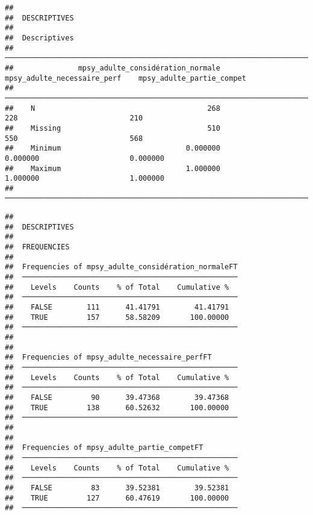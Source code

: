 \documentclass[
]{article}
\begin{document}
\begin{verbatim}
## 
##  DESCRIPTIVES
## 
##  Descriptives                                                                                                 
##  ──────────────────────────────────────────────────────────────────────────────────────────────────────────── 
##               mpsy_adulte_considération_normale    mpsy_adulte_necessaire_perf    mpsy_adulte_partie_compet   
##  ──────────────────────────────────────────────────────────────────────────────────────────────────────────── 
##    N                                        268                            228                          210   
##    Missing                                  510                            550                          568   
##    Minimum                             0.000000                       0.000000                     0.000000   
##    Maximum                             1.000000                       1.000000                     1.000000   
##  ────────────────────────────────────────────────────────────────────────────────────────────────────────────
\end{verbatim}

\begin{verbatim}
## 
##  DESCRIPTIVES
## 
##  FREQUENCIES
## 
##  Frequencies of mpsy_adulte_considération_normaleFT 
##  ────────────────────────────────────────────────── 
##    Levels    Counts    % of Total    Cumulative %   
##  ────────────────────────────────────────────────── 
##    FALSE        111      41.41791        41.41791   
##    TRUE         157      58.58209       100.00000   
##  ────────────────────────────────────────────────── 
## 
## 
##  Frequencies of mpsy_adulte_necessaire_perfFT       
##  ────────────────────────────────────────────────── 
##    Levels    Counts    % of Total    Cumulative %   
##  ────────────────────────────────────────────────── 
##    FALSE         90      39.47368        39.47368   
##    TRUE         138      60.52632       100.00000   
##  ────────────────────────────────────────────────── 
## 
## 
##  Frequencies of mpsy_adulte_partie_competFT         
##  ────────────────────────────────────────────────── 
##    Levels    Counts    % of Total    Cumulative %   
##  ────────────────────────────────────────────────── 
##    FALSE         83      39.52381        39.52381   
##    TRUE         127      60.47619       100.00000   
##  ──────────────────────────────────────────────────
\end{verbatim}
\end{document}
